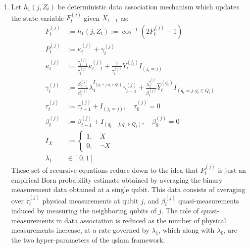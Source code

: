 \begin{enumerate}
=== === === === === === === === \\
\item Let $h_1(j, Z_t)$ be deterministic data association mechanism which updates the state variable $F_t^{(j)}$  given $X_{t-1}$ as:
\begin{align}
F_t^{(j)} &:= h_1(j, Z_t) := \cos^{-1} (2P_t^{(j)} - 1) \\
P_t^{(j)} &:= \kappa_{t}^{(j)} + \gamma_{t}^{(j)} \\
\kappa_{t}^{(j)} &:= \frac{\tau_{t-1}^{(j)}}{\tau_{t}^{(j)}}  \kappa_{t-1}^{(j)} + \frac{1}{\tau_t^{(j)}} Y_t^{(j_t)}I_{(j_t = j)} \\
\gamma_{t}^{(j)} &:= \frac{\beta_{t-1}^{(j)} }{\beta_{t}^{(j)}}  \lambda_1^{I_{(q_t= j, q_t \in Q_t)}} \gamma_{t-1}^{(j)} + \frac{\lambda_1^{\tau_t^{(j)}}}{\beta_t^{(j)}} \hat{Y}_t^{(q_t)}I_{(q_t= j, q_t \in Q_t)} \\
\tau_t^{(j)} &:= \tau_{t-1}^{(j)} + I_{(j_t = j)}, \quad \tau_0^{(j)} =0 \\
\beta_t^{(j)} &:= \beta_{t-1}^{(j)} + I_{(q_t= j, q_t \in Q_t)}, \quad \beta_0^{(j)} =0 \\
I_{X} &:= \begin{cases}
1, \quad X \\
0, \quad \neg X 
\end{cases} \\
\lambda_1 &\in [0,1]
\end{align} These set of recursive equations reduce down to the idea that $P_t^{(j)}$ is just an empirical Born probability estimate obtained by averaging the binary measurement data obtained at a single qubit. This data consists of averaging over $\tau_t^{(j)}$ physical measurements at qubit $j$,  and $\beta_t^{(j)}$ quasi-measurements induced by measuring the neighboring qubits of $j$. The role of quasi-measurements in data association is reduced as the number of physical measurements increase, at a rate governed by $\lambda_1$, which along with $\lambda_0$, are the two hyper-parameters of the qslam framework. 

\end{enumerate}
